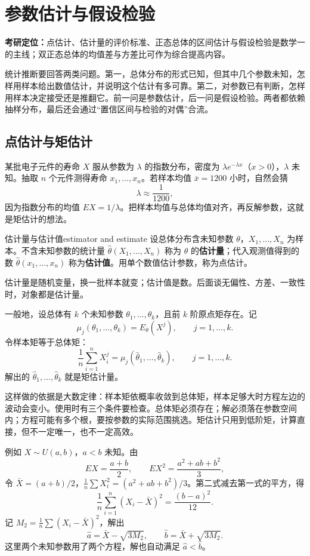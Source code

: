 \section{参数估计与假设检验}

\noindent\textbf{考研定位：}点估计、估计量的评价标准、正态总体的区间估计与假设检验是数学一的主线；双正态总体的均值差与方差比可作为综合提高内容。

统计推断要回答两类问题。第一，总体分布的形式已知，但其中几个参数未知，怎样用样本给出数值估计，并说明这个估计有多可靠。第二，对参数已有判断，怎样用样本决定接受还是推翻它。前一问是参数估计，后一问是假设检验。两者都依赖抽样分布，最后还会通过“置信区间与检验的对偶”合流。

\subsection{点估计与矩估计}

某批电子元件的寿命 $X$ 服从参数为 $\lambda$ 的指数分布，密度为 $\lambda e^{-\lambda x}$（$x>0$），$\lambda$ 未知。抽取 $n$ 个元件测得寿命 $x_1,\ldots,x_n$。若样本均值 $\bar x=1200$ 小时，自然会猜
\[
\lambda\approx \frac{1}{1200},
\]
因为指数分布的均值 $E X=1/\lambda$。把样本均值与总体均值对齐，再反解参数，这就是矩估计的想法。

\begin{mydef}{估计量与估计值}{estimator and estimate}
设总体分布含未知参数 $\theta$，$X_1,\ldots,X_n$ 为样本。不含未知参数的统计量 $\widehat\theta(X_1,\ldots,X_n)$ 称为 $\theta$ 的\textbf{估计量}；代入观测值得到的数 $\widehat\theta(x_1,\ldots,x_n)$ 称为\textbf{估计值}。用单个数值估计参数，称为点估计。
\end{mydef}

估计量是随机变量，换一批样本就变；估计值是数。后面谈无偏性、方差、一致性时，对象都是估计量。

一般地，设总体有 $k$ 个未知参数 $\theta_1,\ldots,\theta_k$，且前 $k$ 阶原点矩存在。记
\[
\mu_j(\theta_1,\ldots,\theta_k)=E_\theta(X^j),\qquad j=1,\ldots,k.
\]
令样本矩等于总体矩：
\[
\frac{1}{n}\sum_{i=1}^{n}X_i^j=\mu_j(\widehat\theta_1,\ldots,\widehat\theta_k),
\qquad j=1,\ldots,k.
\]
解出的 $\widehat\theta_1,\ldots,\widehat\theta_k$ 就是矩估计量。

这样做的依据是大数定律：样本矩依概率收敛到总体矩，样本足够大时方程左边的波动会变小。使用时有三个条件要检查。总体矩必须存在；解必须落在参数空间内；方程可能有多个根，要按参数的实际范围挑选。矩估计只用到低阶矩，计算直接，但不一定唯一，也不一定高效。

例如 $X\sim U(a,b)$，$a<b$ 未知。由
\[
E X=\frac{a+b}{2},\qquad E X^2=\frac{a^2+ab+b^2}{3},
\]
令 $\bar X=(a+b)/2$，$\frac1n\sum X_i^2=(a^2+ab+b^2)/3$。第二式减去第一式的平方，得
\[
\frac{1}{n}\sum_{i=1}^{n}(X_i-\bar X)^2=\frac{(b-a)^2}{12}.
\]
记 $M_2=\frac1n\sum(X_i-\bar X)^2$，解出
\[
\widehat a=\bar X-\sqrt{3M_2},\qquad
\widehat b=\bar X+\sqrt{3M_2}.
\]
这里两个未知参数用了两个方程，解也自动满足 $\widehat a<\widehat b$。

